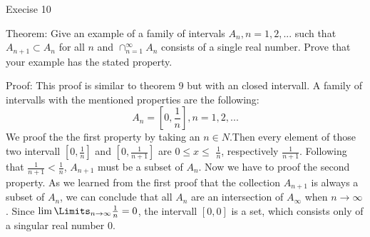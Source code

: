 \documentclass[12pt]{article}
\begin{document}
Execise 10

Theorem: Give an example of a family of intervals $A_n,n=1,2,...$ such that $A_{n+1}\subset A_n$ for all $n$ and $\cap_{n=1}^{\infty}A_n$ consists of a single real number. Prove that your example has the stated property.


Proof: This proof is similar to theorem 9 but with an closed intervall. A family of intervalls with the mentioned properties are the following:
\[A_n=[0,\frac{1}{n}], n = 1,2,...\]
We proof the the first property by taking an $n \in N$.Then every element of those two intervall $[0,\frac{1}{n}]$ and $[0,\frac{1}{n+1}]$ are $0 \leq x \leq$ $\frac{1}{n}$, respectively  $\frac{1}{n+1}$. Following that $\frac{1}{n+1} < \frac{1}{n}$, $A_{n+1}$ must be a subset of $A_n$.
Now we have to proof the second property. As we learned from the first proof that the collection $A_{n+1}$ is always a subset of $A_n$, we can conclude that all $A_n$ are an intersection of $A_\infty$ when $n \to \infty$.
Since $\lim \Limits_{n \to \infty} \frac{1}{n} = 0$, the intervall $[0, 0]$ is a set, which consists only of a singular real number $0$.
\end{document}
